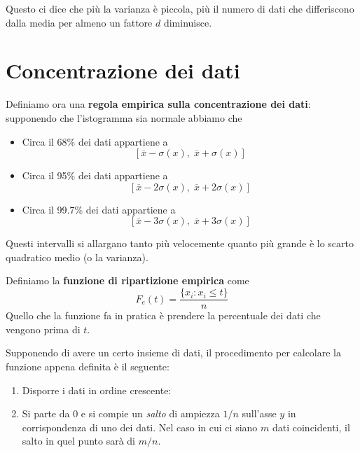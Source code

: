 \begin{observation}
	Questo ci dice che più la varianza è piccola, più il numero di dati che differiscono dalla media per almeno
	un fattore $d$ diminuisce.
\end{observation}

\section{Concentrazione dei dati}
\begin{definition}
	Definiamo ora una \textbf{regola empirica sulla concentrazione dei dati}: supponendo che l'istogramma sia
	normale abbiamo che
	\begin{itemize}
		\item Circa il 68\% dei dati appartiene a
		      \[ [ \overline{x} - \sigma(x),\; \overline{x} + \sigma(x) ] \]
		\item Circa il 95\% dei dati appartiene a
		      \[ [ \overline{x} - 2 \sigma(x),\; \overline{x} + 2 \sigma(x) ] \]
		\item Circa il 99.7\% dei dati appartiene a
		      \[ [ \overline{x} - 3 \sigma(x),\; \overline{x} + 3 \sigma(x) ] \]
	\end{itemize}
	Questi intervalli si allargano tanto più velocemente quanto più grande è lo scarto quadratico medio (o la
	varianza).
\end{definition}

\begin{definition}
	Definiamo la \textbf{funzione di ripartizione empirica} come
	\[ F_e(t) = \frac{\{ x_i : x_i \leq t \}}{n} \]
	Quello che la funzione fa in pratica è prendere la percentuale dei dati che vengono prima di $t$.
\end{definition}

Supponendo di avere un certo insieme di dati, il procedimento per calcolare la funzione appena definita è il
seguente:
\begin{enumerate}
	\item Disporre i dati in ordine crescente:
	\item Si parte da 0 e si compie un \emph{salto} di ampiezza $1 / n$ sull'asse $y$ in corrispondenza di uno
	      dei dati. Nel caso in cui ci siano $m$ dati coincidenti, il salto in quel punto sarà di $m / n$.
\end{enumerate}

